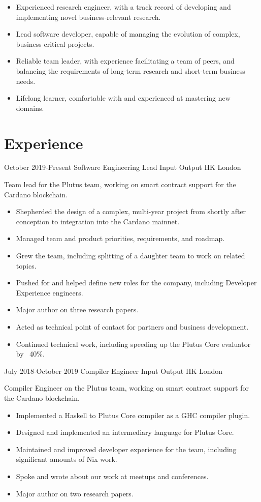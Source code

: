 \documentclass[12pt,a4paper,sans]{moderncv}
\begin{document}
\maketitle

\begin{itemize}
  \item Experienced research engineer, with a track record of developing and implementing novel business-relevant research.
  \item Lead software developer, capable of managing the evolution of complex, business-critical projects.
  \item Reliable team leader, with experience facilitating a team of peers, and balancing the requirements of long-term research and short-term business needs.
  \item Lifelong learner, comfortable with and experienced at mastering new domains.
\end{itemize}

\section{Experience}
\cventry
{October 2019-Present}
{Software Engineering Lead}
{Input Output HK}
{London}
{}
{
  Team lead for the Plutus team, working on smart contract support for the Cardano blockchain.
  \begin{itemize}
    \item Shepherded the design of a complex, multi-year project from shortly after conception to integration into the Cardano mainnet.
    \item Managed team and product priorities, requirements, and roadmap.
    \item Grew the team, including splitting of a daughter team to work on related topics.
    \item Pushed for and helped define new roles for the company, including Developer Experience engineers.
    \item Major author on three research papers.
    \item Acted as technical point of contact for partners and business development.
    \item Continued technical work, including speeding up the Plutus Core evaluator by ~40\%.
  \end{itemize}
}

\cventry
{July 2018-October 2019}
{Compiler Engineer}
{Input Output HK}
{London}
{}
{
  Compiler Engineer on the Plutus team, working on smart contract support for the Cardano blockchain.
  \begin{itemize}
    \item Implemented a Haskell to Plutus Core compiler as a GHC compiler plugin.
    \item Designed and implemented an intermediary language for Plutus Core.
    \item Maintained and improved developer experience for the team, including significant amounts of Nix work.
    \item Spoke and wrote about our work at meetups and conferences.
    \item Major author on two research papers.
  \end{itemize}
}
\end{document}
